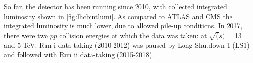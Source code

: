 So far, the detector has been running since 2010, with collected integrated luminosity shown in \autoref{fig:lhcbintlumi}. As compared to \Gls{ATLAS} and \Gls{CMS} the integrated luminosity is much lower, due to allowed pile-up conditions. In 2017, there were two $pp$ collision energies at which the data was taken: at $\sqrt(s)$  = 13 and 5 TeV. Run \Rn{1} data-taking (2010-2012) was paused by Long Shutdown 1 (\Gls{LS1}) and followed with Run \Rn{2} data-taking (2015-2018). 






